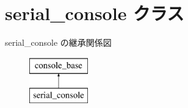 \hypertarget{classserial__console}{}\section{serial\+\_\+console クラス}
\label{classserial__console}
serial\+\_\+console の継承関係図\begin{figure}[H]
\begin{center}
\leavevmode
\includegraphics[height=2.000000cm]{classserial__console}
\end{center}
\end{figure}
